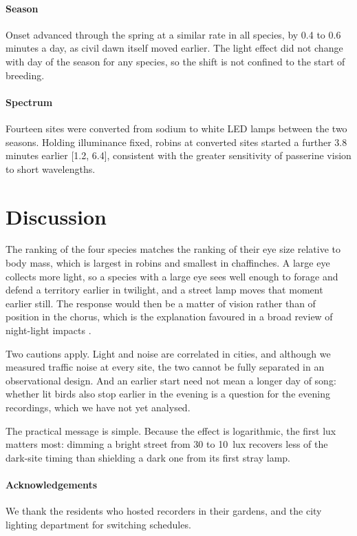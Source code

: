 \documentclass[11pt]{article}
\newcommand{\sidecite}[2][]{\sidenote{\fullcite[#1]{#2}.}}
\begin{document}
\paragraph{Season} Onset advanced through the spring at a similar rate in all
species, by 0.4 to 0.6 minutes a day, as civil dawn itself moved earlier. The
light effect did not change with day of the season for any species, so the
shift is not confined to the start of breeding.

\paragraph{Spectrum} Fourteen sites were converted from sodium to white LED
lamps between the two seasons. Holding illuminance fixed, robins at converted
sites started a further 3.8 minutes earlier [1.2, 6.4], consistent with the
greater sensitivity of passerine vision to short wavelengths.%
\sidecite{hale2017}

\section{Discussion}

The ranking of the four species matches the ranking of their eye size
relative to body mass, which is largest in robins and smallest in chaffinches.%
\sidecite{moreau2022} A large eye collects more light, so a species with a
large eye sees well enough to forage and defend a territory earlier in
twilight, and a street lamp moves that moment earlier still. The response
would then be a matter of vision rather than of position in the chorus, which
is the explanation favoured in a broad review of night-light impacts
\parencite{gaston2013}.

Two cautions apply. Light and noise are correlated in cities, and although we
measured traffic noise at every site, the two cannot be fully separated in an
observational design. And an earlier start need not mean a longer day of song:
whether lit birds also stop earlier in the evening is a question for the
evening recordings, which we have not yet analysed.

The practical message is simple. Because the effect is logarithmic, the first
lux matters most: dimming a bright street from 30 to 10~lux recovers less of
the dark-site timing than shielding a dark one from its first stray lamp.

\paragraph{Acknowledgements} We thank the residents who hosted recorders in
their gardens, and the city lighting department for switching schedules.

\printbibliography[heading=bibintoc, title={References}]
\end{document}
